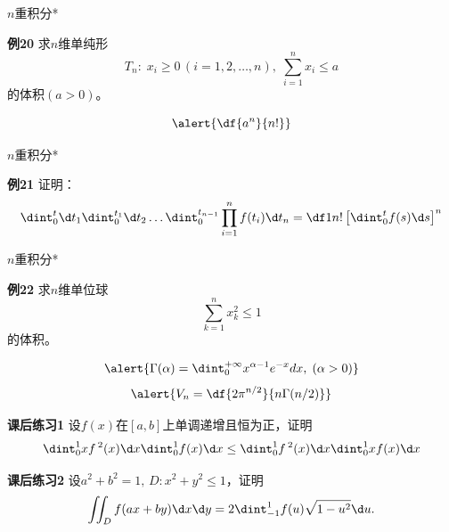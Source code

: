 
\begin{frame}{$n$重积分*}
	\linespread{1.2}
	\begin{exampleblock}{{\bf 例20}\hfill}
		求$n$维单纯形
		$$T_n:\; x_i\geq 0\,(i=1,2,\ldots,n),\;
		\sum\limits_{i=1}^nx_i\leq a$$
		的体积$(a>0)$。
	\end{exampleblock}
	\pause
	$$\alert{\df{a^n}{n!}}$$
\end{frame}

\begin{frame}{$n$重积分*}
	\linespread{1.2}
	\begin{exampleblock}{{\bf 例21}\hfill}
		证明：
		$$\dint_0^t\d t_1\dint_0^{t_1}\d t_2\ldots
		\dint_0^{t_{n-1}}\prod\limits_{i=1}^nf(t_i)\d t_n
		=\df 1{n!}\left[\dint_0^tf(s)\d s\right]^n$$
	\end{exampleblock}
\end{frame}

\begin{frame}{$n$重积分*}
	\linespread{1.2}
	\begin{exampleblock}{{\bf 例22}\hfill}
		求$n$维单位球
		$$\sum\limits_{k=1}^nx_k^2\leq 1$$
		的体积。
	\end{exampleblock}
	\pause
	$$\alert{\Gamma(\alpha)=\dint_0^{+\infty}x^{\alpha-1}e^{-x}dx,\;(\alpha>0)}$$
	\pause
	$$\alert{V_n=\df{2\pi^{n/2}}{n\Gamma(n/2)}}$$
\end{frame}

\begin{frame}
	\linespread{1.2}
	\begin{exampleblock}{{\bf 课后练习1}\hfill}
		设$f(x)$在$[a,b]$上单调递增且恒为正，证明
		$${\dint_0^1xf\,^2(x)\d x}{\dint_0^1f(x)\d x}\leq
		{\dint_0^1f\,^2(x)\d x}{\dint_0^1xf(x)\d x}$$
	\end{exampleblock}
	\bigskip
	\begin{exampleblock}{{\bf 课后练习2}\hfill}
		设$a^2+b^2=1,\, D:x^2+y^2\leq 1$，证明
		$$\iint_Df(ax+by)\d x\d y=2\dint_{-1}^1f(u)\sqrt{1-u^2}\d u.$$
	\end{exampleblock}
\end{frame}


